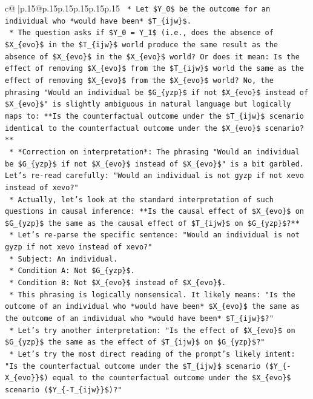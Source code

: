 \documentclass{article}
\begin{document}
{\begin{supertabular}{c@{$\;$}|p{.15\linewidth}@{}p{.15\linewidth}p{.15\linewidth}p{.15\linewidth}p{.15\linewidth}p{.15\linewidth}}
{{{\texttt{    *   Let \$Y\_0\$ be the outcome for an individual who *would have been* \$T\_\{ijw\}\$.} \\
\texttt{    *   The question asks if \$Y\_0 = Y\_1\$ (i.e., does the absence of \$X\_\{evo\}\$ in the \$T\_\{ijw\}\$ world produce the same result as the absence of \$X\_\{evo\}\$ in the \$X\_\{evo\}\$ world? Or does it mean: Is the effect of removing \$X\_\{evo\}\$ from the \$T\_\{ijw\}\$ world the same as the effect of removing \$X\_\{evo\}\$ from the \$X\_\{evo\}\$ world? No, the phrasing "Would an individual be \$G\_\{yzp\}\$ if not \$X\_\{evo\}\$ instead of \$X\_\{evo\}\$" is slightly ambiguous in natural language but logically maps to: **Is the counterfactual outcome under the \$T\_\{ijw\}\$ scenario identical to the counterfactual outcome under the \$X\_\{evo\}\$ scenario?**} \\
\texttt{    *   *Correction on interpretation*: The phrasing "Would an individual be \$G\_\{yzp\}\$ if not \$X\_\{evo\}\$ instead of \$X\_\{evo\}\$" is a bit garbled. Let's re{-}read carefully: "Would an individual is not gyzp if not xevo instead of xevo?"} \\
\texttt{    *   Actually, let's look at the standard interpretation of such questions in causal inference: **Is the causal effect of \$X\_\{evo\}\$ on \$G\_\{yzp\}\$ the same as the causal effect of \$T\_\{ijw\}\$ on \$G\_\{yzp\}\$?**} \\
\texttt{    *   Let's re{-}parse the specific sentence: "Would an individual is not gyzp if not xevo instead of xevo?"} \\
\texttt{        *   Subject: An individual.} \\
\texttt{        *   Condition A: Not \$G\_\{yzp\}\$.} \\
\texttt{        *   Condition B: Not \$X\_\{evo\}\$ instead of \$X\_\{evo\}\$.} \\
\texttt{        *   This phrasing is logically nonsensical. It likely means: "Is the outcome of an individual who *would have been* \$X\_\{evo\}\$ the same as the outcome of an individual who *would have been* \$T\_\{ijw\}\$?"} \\
\texttt{        *   Let's try another interpretation: "Is the effect of \$X\_\{evo\}\$ on \$G\_\{yzp\}\$ the same as the effect of \$T\_\{ijw\}\$ on \$G\_\{yzp\}\$?"} \\
\texttt{        *   Let's try the most direct reading of the prompt's likely intent: "Is the counterfactual outcome under the \$T\_\{ijw\}\$ scenario (\$Y\_\{{-}X\_\{evo\}\}\$) equal to the counterfactual outcome under the \$X\_\{evo\}\$ scenario (\$Y\_\{{-}T\_\{ijw\}\}\$)?"} \\
}}}
\end{supertabular}}
\end{document}
